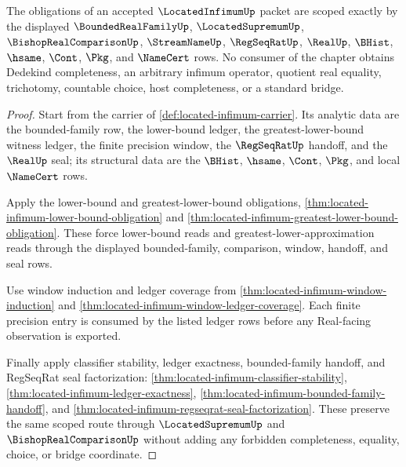 \begin{theorem}
\label{thm:located-infimum-scoped-kernel-dependency}
The obligations of an accepted $\LocatedInfimumUp$ packet are scoped exactly by the displayed $\BoundedRealFamilyUp$, $\LocatedSupremumUp$, $\BishopRealComparisonUp$, $\StreamNameUp$, $\RegSeqRatUp$, $\RealUp$, $\BHist$, $\hsame$, $\Cont$, $\Pkg$, and $\NameCert$ rows. No consumer of the chapter obtains Dedekind completeness, an arbitrary infimum operator, quotient real equality, trichotomy, countable choice, host completeness, or a standard bridge.
\end{theorem}
\begin{proof}
Start from the carrier of \autoref{def:located-infimum-carrier}. Its analytic data are the bounded-family row, the lower-bound ledger, the greatest-lower-bound witness ledger, the finite precision window, the $\RegSeqRatUp$ handoff, and the $\RealUp$ seal; its structural data are the $\BHist$, $\hsame$, $\Cont$, $\Pkg$, and local $\NameCert$ rows.

Apply the lower-bound and greatest-lower-bound obligations, \autoref{thm:located-infimum-lower-bound-obligation} and \autoref{thm:located-infimum-greatest-lower-bound-obligation}. These force lower-bound reads and greatest-lower-approximation reads through the displayed bounded-family, comparison, window, handoff, and seal rows.

Use window induction and ledger coverage from \autoref{thm:located-infimum-window-induction} and \autoref{thm:located-infimum-window-ledger-coverage}. Each finite precision entry is consumed by the listed ledger rows before any Real-facing observation is exported.

Finally apply classifier stability, ledger exactness, bounded-family handoff, and RegSeqRat seal factorization: \autoref{thm:located-infimum-classifier-stability}, \autoref{thm:located-infimum-ledger-exactness}, \autoref{thm:located-infimum-bounded-family-handoff}, and \autoref{thm:located-infimum-regseqrat-seal-factorization}. These preserve the same scoped route through $\LocatedSupremumUp$ and $\BishopRealComparisonUp$ without adding any forbidden completeness, equality, choice, or bridge coordinate.
\end{proof}

